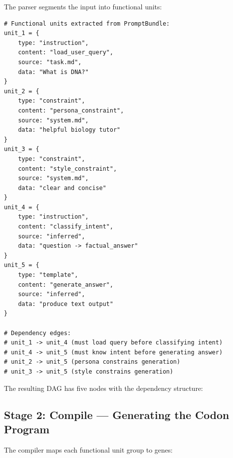 The parser segments the input into functional units:

\begin{lstlisting}[style=dogmapython, caption={Genomic IR after parsing (pseudocode representation).}]
# Functional units extracted from PromptBundle:
unit_1 = {
    type: "instruction",
    content: "load_user_query",
    source: "task.md",
    data: "What is DNA?"
}
unit_2 = {
    type: "constraint",
    content: "persona_constraint",
    source: "system.md",
    data: "helpful biology tutor"
}
unit_3 = {
    type: "constraint",
    content: "style_constraint",
    source: "system.md",
    data: "clear and concise"
}
unit_4 = {
    type: "instruction",
    content: "classify_intent",
    source: "inferred",
    data: "question -> factual_answer"
}
unit_5 = {
    type: "template",
    content: "generate_answer",
    source: "inferred",
    data: "produce text output"
}

# Dependency edges:
# unit_1 -> unit_4 (must load query before classifying intent)
# unit_4 -> unit_5 (must know intent before generating answer)
# unit_2 -> unit_5 (persona constrains generation)
# unit_3 -> unit_5 (style constrains generation)
\end{lstlisting}

The resulting DAG has five nodes with the dependency structure:
\begin{center}
\end{center}

\subsection{Stage 2: Compile --- Generating the Codon Program}

The compiler maps each functional unit group to genes:

